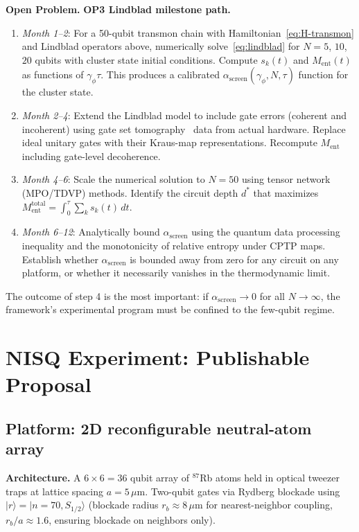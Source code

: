 \documentclass[12pt,letterpaper]{article}
\theoremstyle{plain}
\theoremstyle{definition}
\theoremstyle{remark}
\newenvironment{openprobbox}{%
  \begin{mdframed}[backgroundcolor=boxgray,linecolor=openblue,linewidth=1.2pt]
  \noindent\textcolor{openblue}{\textbf{Open Problem.}}\quad}{%
  \end{mdframed}}
\newcommand{\Ment}{M_{\mathrm{ent}}}
\newcommand{\asc}{\alpha_{\mathrm{screen}}}
\begin{document}
\begin{openprobbox}
\textbf{OP3 Lindblad milestone path.}
\begin{enumerate}
  \item \textit{Month 1--2}: For a 50-qubit transmon chain with Hamiltonian~\eqref{eq:H-transmon}
    and Lindblad operators above, numerically solve~\eqref{eq:lindblad} for $N = 5$, $10$, $20$
    qubits with cluster state initial conditions.  Compute $s_k(t)$ and $\Ment(t)$ as functions
    of $\gamma_\phi\tau$.  This produces a calibrated $\asc(\gamma_\phi, N, \tau)$ function for
    the cluster state.
  \item \textit{Month 2--4}: Extend the Lindblad model to include gate errors (coherent and
    incoherent) using gate set tomography~\cite{Blume2017} data from actual hardware.  Replace
    ideal unitary gates with their Kraus-map representations.  Recompute $\Ment$ including
    gate-level decoherence.
  \item \textit{Month 4--6}: Scale the numerical solution to $N = 50$ using tensor network
    (MPO/TDVP) methods.  Identify the circuit depth $d^*$ that maximizes
    $\Ment^{\mathrm{total}} = \int_0^\tau \sum_k s_k(t)\,dt$.
  \item \textit{Month 6--12}: Analytically bound $\asc$ using the quantum data processing
    inequality and the monotonicity of relative entropy under CPTP maps.  Establish whether
    $\asc$ is bounded away from zero for any circuit on any platform, or whether it
    necessarily vanishes in the thermodynamic limit.
\end{enumerate}
The outcome of step 4 is the most important: if $\asc \to 0$ for all $N \to \infty$,
the framework's experimental program must be confined to the few-qubit regime.
\end{openprobbox}

\section{NISQ Experiment: Publishable Proposal}
\label{sec:experiment}

\subsection{Platform: 2D reconfigurable neutral-atom array}

\textbf{Architecture.}
A $6 \times 6 = 36$ qubit array of $^{87}$Rb atoms held in optical tweezer traps
at lattice spacing $a = 5\,\mu$m.  Two-qubit gates via Rydberg blockade using
$|r\rangle = |n\!=\!70, S_{1/2}\rangle$ (blockade radius $r_b \approx 8\,\mu$m for
nearest-neighbor coupling, $r_b/a \approx 1.6$, ensuring blockade on neighbors only).
\end{document}

